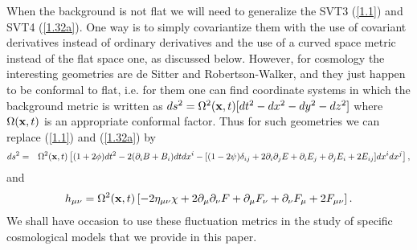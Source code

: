 \documentclass[aps,onecolumn,10pt]{revtex4}
\numberwithin{equation}{section}
\numberwithin{equation}{section}
\begin{document}
When the background is not flat we will need to generalize the SVT3 (\ref{1.1}) and SVT4 (\ref{1.32a}). One way  is to simply covariantize them with the use of covariant derivatives instead of ordinary derivatives and the use of a curved space metric instead of the flat space one, as discussed below. However, for cosmology the interesting geometries are de Sitter and Robertson-Walker, and they just happen to be conformal to flat, i.e. for them one can find coordinate systems in which the background metric is written as $ds^2=\Omega^2({\bf x},t)[dt^2-dx^2-dy^2-dz^2]$ where $\Omega ({\bf x},t)$ is an appropriate conformal factor. Thus for such geometries we can replace (\ref{1.1}) and (\ref{1.32a}) by 
%
\begin{eqnarray}
ds^2 &=&\Omega^2({\bf x},t)\left[(1+2\phi) dt^2 -2(\partial_i B +B_i)dt dx^i - [(1-2\psi)\delta_{ij} +2\partial_i\partial_j E + \partial_i E_j + \partial_j E_i + 2E_{ij}]dx^i dx^j\right],
\label{1.42a}
\end{eqnarray}
%
and 
%
\begin{eqnarray}
h_{\mu\nu}=\Omega^2({\bf x},t)\left[-2\eta_{\mu\nu}\chi+2\partial_{\mu}\partial_{\nu}F
+ \partial_{\mu}F_{\nu}+\partial_{\nu}F_{\mu}+2F_{\mu\nu}\right].
\label{1.43a}
\end{eqnarray}
%
We shall have occasion to use these fluctuation metrics in the study of specific cosmological models that we provide in this paper.
\end{document}

